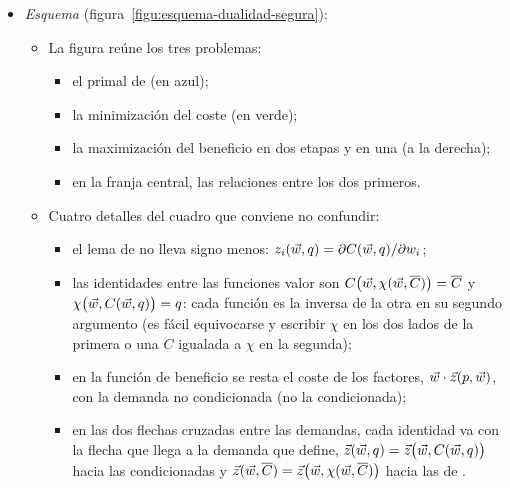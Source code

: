\documentclass[11pt]{article}
\begin{document}
\begin{itemize}
\begin{itemize}
  \begin{itemize}
  \item la empresa no tiene un presupuesto fijo que la obligue a producir lo máximo posible con él;
  \item sus demandas $\vect{z}(\vect{w},\overline{C})$ no tienen nombre propio en la literatura;
  \item no hay una restricción presupuestaria que dé un efecto renta.
  \end{itemize}
\item Los manuales de referencia\nocite{MasColellWhinstonGreen1995,JehleReny2011Advanced} estudian, en su lugar, la minimización del coste (dual de la tecnología) y la maximización del beneficio, cuya descomposición tiene un efecto escala (apartado~\ref{sec:analisis-variaciones-precio}).
\end{itemize}
\item \emph{Esquema} (figura~\ref{figu:esquema-dualidad-segura}):
\begin{itemize}
\item La figura reúne los tres problemas:
  \begin{itemize}
  \item el primal de  (en azul);
  \item la minimización del coste (en verde);
  \item la maximización del beneficio en dos etapas y en una (a la derecha);
  \item en la franja central, las relaciones entre los dos primeros.
  \end{itemize}
\item Cuatro detalles del cuadro que conviene no confundir:
  \begin{itemize}
  \item el lema de  no lleva signo menos: $z_i(\vec{w},q)=\partial C(\vec{w},q)/\partial w_i$;
  \item las identidades entre las funciones valor son $C\big(\vec{w},\chi(\vec{w},\overline{C})\big)=\overline{C}$ y $\chi\big(\vec{w},C(\vec{w},q)\big)=q$: cada función es la inversa de la otra en su segundo argumento (es fácil equivocarse y escribir $\chi$ en los dos lados de la primera o una $C$ igualada a $\chi$ en la segunda);
  \item en la función de beneficio se resta el coste de los factores, $\vec{w}\cdot\vec{z}(p,\vec{w})$, con la demanda no condicionada (no la condicionada);
  \item en las dos flechas cruzadas entre las demandas, cada identidad va con la flecha que llega a la demanda que define, $\vec{z}(\vec{w},q)=\vec{z}\big(\vec{w},C(\vec{w},q)\big)$ hacia las condicionadas y $\vec{z}(\vec{w},\overline{C})=\vec{z}\big(\vec{w},\chi(\vec{w},\overline{C})\big)$ hacia las de .
  \end{itemize}
\end{itemize}
\end{itemize}
\end{document}
